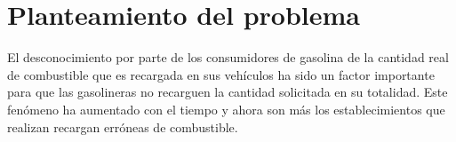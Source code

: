
\section{Planteamiento del problema}
El desconocimiento por parte de los consumidores de gasolina de la cantidad real de combustible que es recargada en sus vehículos ha sido un factor importante para que las gasolineras no recarguen la cantidad solicitada en su totalidad. Este fenómeno ha aumentado con el tiempo y ahora son más los establecimientos que realizan recargan erróneas de combustible.